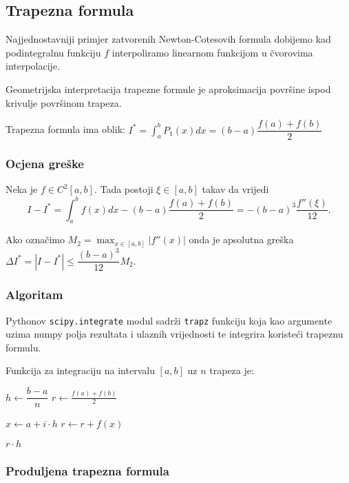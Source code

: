 \subsection{Trapezna formula}

Najjednostavniji primjer zatvorenih Newton-Cotesovih formula dobijemo kad
podintegralnu funkciju $f$ interpoliramo linearnom funkcijom u čvorovima
interpolacije.

Geometrijska interpretacija trapezne formule je aproksimacija površine ispod
krivulje površinom trapeza.

Trapezna formula ima oblik: $\displaystyle
I^* = \int_a^b P_1(x)dx = (b-a)\dfrac{f(a)+f(b)}{2}
$

\subsubsection{Ocjena greške}

Neka je $f\in C^2[a,b]$. Tada postoji $\xi \in [a,b]$ takav da vrijedi
$$
I - I^* = \int_a^b f(x) dx - (b-a)\dfrac{f(a)+f(b)}{2} = -(b-a)^3\dfrac{f''(\xi)}{12}.
$$

Ako označimo $\displaystyle M_2 = \max_{x\in[a,b]}|f''(x)|$ onda je apsolutna
greška $\displaystyle \Delta I^* = |I - I^*| \leq \dfrac{(b-a)^3}{12}M_2.$

\subsubsection{Algoritam}

Pythonov \verb|scipy.integrate| modul sadrži \verb|trapz| funkciju koja kao
argumente uzima numpy polja rezultata i ulaznih vrijednosti te integrira
koristeći trapeznu formulu.

Funkcija za integraciju na intervalu $[a, b]$ uz $n$ trapeza je:
\begin{algorithmic}
    \State $h \gets \dfrac{b - a}{n}$
    \State $r \gets \frac{f(a) + f(b)}{2}$
    
      \State $x \gets a + i \cdot h$
      \State $r \gets r + f(x)$
    \EndFor
    
    \State \Return $r \cdot h$
\EndFunction
\end{algorithmic}

\subsubsection{Produljena trapezna formula}

